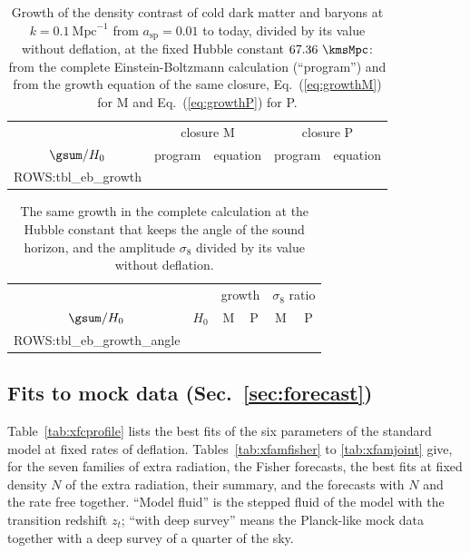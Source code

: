 \begin{table}
\caption{\label{tab:xebgrowth}Growth of the density contrast of cold dark matter and baryons at
$k=0.1~\mathrm{Mpc}^{-1}$ from $a_{\mathrm{sp}}=0.01$ to today, divided by its value without
deflation, at the fixed Hubble constant $67.36~\kmsMpc$: from the complete Einstein-Boltzmann
calculation (``program'') and from the growth equation of the same closure,
Eq.~(\ref{eq:growthM}) for M and Eq.~(\ref{eq:growthP}) for P.}
\begin{ruledtabular}
\begin{tabular}{ccccc}
 & \multicolumn{2}{c}{closure M} & \multicolumn{2}{c}{closure P} \\
$\gsum/H_0$ & program & equation & program & equation \\
\hline
{{ROWS:tbl_eb_growth}}
\end{tabular}
\end{ruledtabular}
\end{table}

\begin{table}
\caption{\label{tab:xebgrowth2}The same growth in the complete calculation at the Hubble
constant that keeps the angle of the sound horizon, and the amplitude $\sigma_8$ divided by its value
without deflation.}
\begin{ruledtabular}
\begin{tabular}{cccccc}
 & & \multicolumn{2}{c}{growth} & \multicolumn{2}{c}{$\sigma_8$ ratio} \\
$\gsum/H_0$ & $H_0$ & M & P & M & P \\
\hline
{{ROWS:tbl_eb_growth_angle}}
\end{tabular}
\end{ruledtabular}
\end{table}

\subsection{Fits to mock data (Sec.~\ref{sec:forecast})}

Table~\ref{tab:xfcprofile} lists the best fits of the six parameters of the standard model at fixed
rates of deflation. Tables~\ref{tab:xfamfisher} to \ref{tab:xfamjoint} give, for the seven families
of extra radiation, the Fisher forecasts, the best fits at fixed density $N$ of the extra radiation,
their summary, and the forecasts with $N$ and the rate free together. ``Model fluid'' is the stepped
fluid of the model with the transition redshift $z_t$; ``with deep survey'' means the Planck-like
mock data together with a deep survey of a quarter of the sky.

